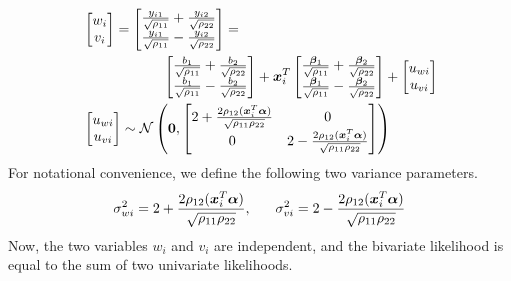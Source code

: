 \documentclass[aoas,preprint]{imsart}
\numberwithin{equation}{section}
\theoremstyle{plain}
\begin{document}
\begin{align} \begin{split}
\hspace{-5mm}& \begin{bmatrix} w_{i} \\ v_{i} \end{bmatrix} = 
\begin{bmatrix} \frac{y_{i1}}{\sqrt{\rho_{11}}} + \frac{y_{i2}}{\sqrt{\rho_{22}}} \\ \frac{y_{i1}}{\sqrt{\rho_{11}}} - \frac{y_{i2}}{\sqrt{\rho_{22}}} \end{bmatrix} = \\
& \hspace{20mm} 
 \begin{bmatrix}
  \frac{{b}_1}{\sqrt{\rho_{11}}} + \frac{{b}_2}{\sqrt{\rho_{22}}}\\
  \frac{{b}_1}{\sqrt{\rho_{11}}} - \frac{{b}_2}{\sqrt{\rho_{22}}}
 \end{bmatrix} + 
 \bm{x}_i^T \begin{bmatrix} \frac{\bm{\beta}_1}{\sqrt{\rho_{11}}} + \frac{\bm{\beta}_2}{\sqrt{\rho_{22}}} \\ \frac{\bm{\beta}_1}{\sqrt{\rho_{11}}} - \frac{\bm{\beta}_2}{\sqrt{\rho_{22}}} \end{bmatrix} + \begin{bmatrix} u_{wi} \\ u_{vi}\end{bmatrix}\\
&  \begin{bmatrix} u_{wi} \\ u_{vi}\end{bmatrix} \sim  \mathcal{N} \left( \bm{0}, \begin{bmatrix} 2 + \frac{2\rho_{12}(\bm{x}_i^T\bm{\alpha})}{\sqrt{\rho_{11}\rho_{22}}} & 0 \\ 0 & 2 - \frac{2\rho_{12}(\bm{x}_i^T\bm{\alpha})}{\sqrt{\rho_{11}\rho_{22}}} \end{bmatrix} \right)
 \end{split} 
  \label{eq:transformed_2genes}
  \end{align}
 For notational convenience, we define the following two variance parameters.
 \begin{equation}
     \sigma_{wi}^2 = 2 + \frac{2\rho_{12}(\bm{x}_i^T \bm{\alpha})}{\sqrt{\rho_{11}\rho_{22}}}, \hspace{6mm}
     \sigma_{vi}^2 = 2 - \frac{2\rho_{12}(\bm{x}_i^T \bm{\alpha})}{\sqrt{\rho_{11}\rho_{22}}}
 \end{equation}
Now, the two variables $w_i$ and $v_i$ are independent, and the bivariate likelihood is equal to the sum of two univariate likelihoods.
\end{document}
